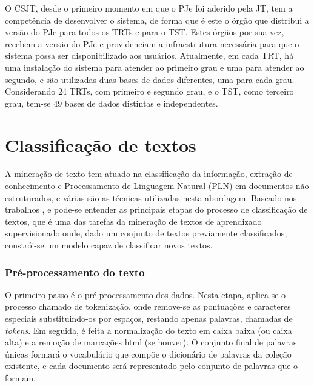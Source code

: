 O CSJT, desde o primeiro momento em que o PJe foi aderido pela JT, tem a competência de desenvolver o sistema, de forma que é este o órgão que distribui a versão do PJe para todos os TRTs e para o TST. Estes órgãos por sua vez, recebem a versão do PJe e providenciam a infraestrutura necessária para que o sistema possa ser disponibilizado aos usuários. Atualmente, em cada TRT, há uma instalação do sistema para atender ao primeiro grau e uma para atender ao segundo, e são utilizadas duas bases de dados diferentes, uma para cada grau. Considerando 24 TRTs, com primeiro e segundo grau, e o TST, como terceiro grau, tem-se 49 bases de dados distintas e independentes.


\section{Classificação de textos}%

A mineração de texto tem atuado na classificação da informação, extração de conhecimento  e Processamento de Linguagem Natural (PLN) em documentos não estruturados, e várias são as técnicas utilizadas nesta abordagem. Baseado nos trabalhos \cite{revisaotmana}, \cite{revisaotmdaniel} e \cite{briefreviewtm} pode-se entender as principais etapas do processo de classificação de textos, que é uma das tarefas da mineração de textos de aprendizado supervisionado onde, dado um conjunto de textos previamente classificados, constrói-se um modelo capaz de classificar novos textos.


\subsubsection{Pré-processamento do texto}

O primeiro passo é o pré-processamento dos dados. Nesta etapa, aplica-se o processo chamado de tokenização, onde remove-se as pontuações e caracteres especiais substituindo-os por espaços, restando apenas palavras, chamadas de \textit{tokens}. Em seguida,  é feita a normalização do texto em caixa baixa (ou caixa alta) e a remoção de marcações html (se houver). O conjunto final de palavras únicas formará o vocabulário que compõe o dicionário de palavras da coleção existente, e cada documento será representado pelo conjunto de palavras que o formam. 


